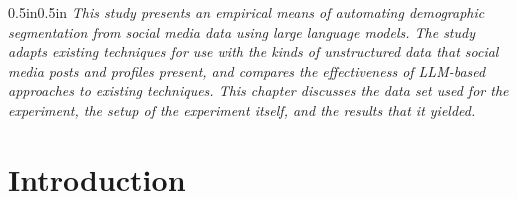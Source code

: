 \documentclass{report}
\begin{document}
\begin{adjustwidth}{0.5in}{0.5in}
\textit{This study presents an empirical means of automating demographic segmentation from social media data using large language models. The study adapts existing techniques for use with the kinds of unstructured data that social media posts and profiles present, and compares the effectiveness of LLM-based approaches to existing techniques. This chapter discusses the data set used for the experiment, the setup of the experiment itself, and the results that it yielded.}
\end{adjustwidth}


\section{Introduction}
\end{document}
